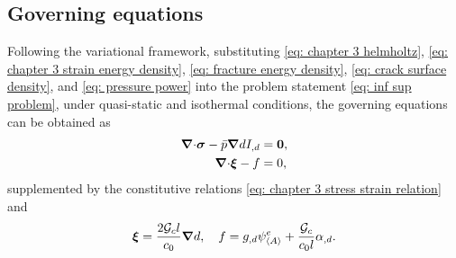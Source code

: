 \subsection{Governing equations}
\label{section: Chapter3/theory/governing}

Following the variational framework, substituting \eqref{eq: chapter 3 helmholtz}, \eqref{eq: chapter 3 strain energy density}, \eqref{eq: fracture energy density}, \eqref{eq: crack surface density}, and \eqref{eq: pressure power} into the problem statement \eqref{eq: inf sup problem}, under quasi-static and isothermal conditions, the governing equations can be obtained as
\begin{align}
  {\boldsymbol{\nabla}\cdot} \boldsymbol{\sigma} - \bar{p} \boldsymbol{\nabla} d I_{,d} & = \boldsymbol{0}, \\
  {\boldsymbol{\nabla} \cdot} \boldsymbol{\xi} - f                     & = 0,      
\end{align}
supplemented by the constitutive relations \eqref{eq: chapter 3 stress strain relation} and
\begin{align}
  \boldsymbol{\xi} = \dfrac{2{\mathcal{G}_c} l}{c_0} \boldsymbol{\nabla} d, \quad f = g_{,d}\psi^e_{\left< A \right>} + \dfrac{{\mathcal{G}_c}}{c_0l}\alpha_{,d}.
\end{align}
